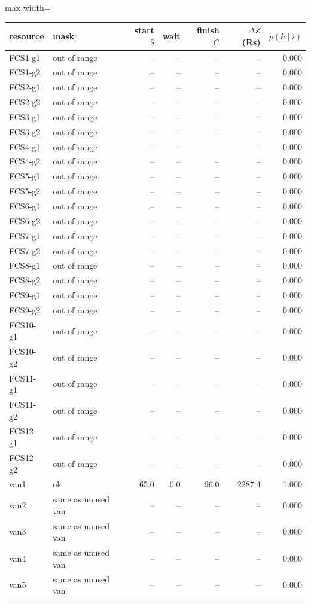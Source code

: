 \footnotesize\begin{adjustbox}{max width=\linewidth}\begin{tabular}{@{}llrrrrr@{}}\toprule
resource & mask & start $S$ & wait & finish $C$ & $\Delta Z$ (Rs) & $p(k\mid i)$ \\\midrule
FCS1-g1 & out of range & -- & -- & -- & -- & 0.000 \\
FCS1-g2 & out of range & -- & -- & -- & -- & 0.000 \\
FCS2-g1 & out of range & -- & -- & -- & -- & 0.000 \\
FCS2-g2 & out of range & -- & -- & -- & -- & 0.000 \\
FCS3-g1 & out of range & -- & -- & -- & -- & 0.000 \\
FCS3-g2 & out of range & -- & -- & -- & -- & 0.000 \\
FCS4-g1 & out of range & -- & -- & -- & -- & 0.000 \\
FCS4-g2 & out of range & -- & -- & -- & -- & 0.000 \\
FCS5-g1 & out of range & -- & -- & -- & -- & 0.000 \\
FCS5-g2 & out of range & -- & -- & -- & -- & 0.000 \\
FCS6-g1 & out of range & -- & -- & -- & -- & 0.000 \\
FCS6-g2 & out of range & -- & -- & -- & -- & 0.000 \\
FCS7-g1 & out of range & -- & -- & -- & -- & 0.000 \\
FCS7-g2 & out of range & -- & -- & -- & -- & 0.000 \\
FCS8-g1 & out of range & -- & -- & -- & -- & 0.000 \\
FCS8-g2 & out of range & -- & -- & -- & -- & 0.000 \\
FCS9-g1 & out of range & -- & -- & -- & -- & 0.000 \\
FCS9-g2 & out of range & -- & -- & -- & -- & 0.000 \\
FCS10-g1 & out of range & -- & -- & -- & -- & 0.000 \\
FCS10-g2 & out of range & -- & -- & -- & -- & 0.000 \\
FCS11-g1 & out of range & -- & -- & -- & -- & 0.000 \\
FCS11-g2 & out of range & -- & -- & -- & -- & 0.000 \\
FCS12-g1 & out of range & -- & -- & -- & -- & 0.000 \\
FCS12-g2 & out of range & -- & -- & -- & -- & 0.000 \\
van1 & ok & 65.0 & 0.0 & 96.0 & 2287.4 & 1.000 \\
van2 & same as unused van & -- & -- & -- & -- & 0.000 \\
van3 & same as unused van & -- & -- & -- & -- & 0.000 \\
van4 & same as unused van & -- & -- & -- & -- & 0.000 \\
van5 & same as unused van & -- & -- & -- & -- & 0.000 \\
\bottomrule\end{tabular}\end{adjustbox}
